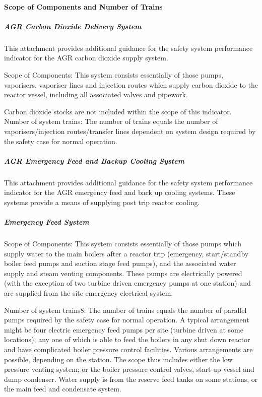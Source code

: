 \paragraph{Scope of Components and Number of Trains}
\subparagraph{AGR Carbon Dioxide Delivery System}

This attachment provides additional guidance for the safety system
performance indicator for the AGR carbon dioxide supply system.

Scope of Components: This system consists essentially of those pumps,
vaporisers, vaporiser lines and injection routes which supply carbon
dioxide to the reactor vessel, including all associated valves and
pipework.

Carbon dioxide stocks are not included within the scope of this indicator.
Number of system trains: The number of trains equals the number of
vaporisers/injection routes/transfer lines dependent on system design
required by the safety case for normal operation.

\subparagraph{AGR Emergency Feed and Backup Cooling System}

This attachment provides additional guidance for the safety system performance indicator for the AGR emergency feed and back up cooling systems. These systems provide a means of supplying post trip reactor cooling.

\subparagraph{Emergency Feed System}

Scope of Components: This system consists essentially of those pumps
which supply water to the main boilers after a reactor trip
(emergency, start/standby boiler feed pumps and suction stage feed
pumps), and the associated water supply and steam venting
components. These pumps are electrically powered (with the exception
of two turbine driven emergency pumps at one station) and are supplied
from the site emergency electrical system.

Number of system trains8: The number of trains equals the number of
parallel pumps required by the safety case for normal operation. A
typical arrangement might be four electric emergency feed pumps per
site (turbine driven at some locations), any one of which is able to
feed the boilers in any shut down reactor and have complicated boiler
pressure control facilities. Various arrangements are possible,
depending on the station. The scope thus includes either the low
pressure venting system; or the boiler pressure control valves,
start-up vessel and dump condenser. Water supply is from the reserve
feed tanks on some stations, or the main feed and condensate system.

